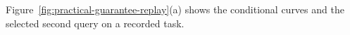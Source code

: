 Figure~\ref{fig:practical-guarantee-replay}(a) shows the conditional curves
and the selected second query on a recorded task.
